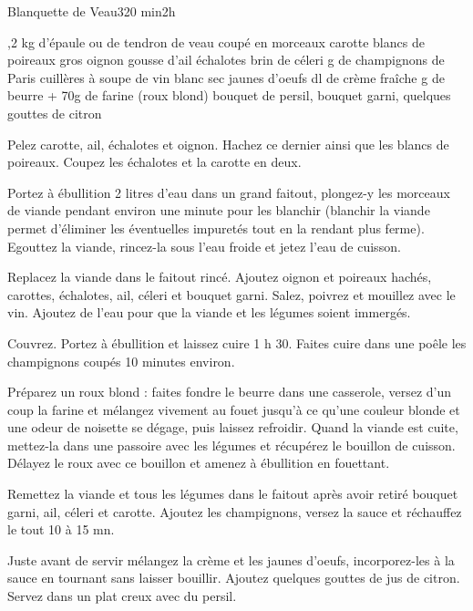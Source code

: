 \begin{recette}{Blanquette de Veau}{3}{20 min}{2h}
\begin{ingredients}
,2 kg d'épaule ou de tendron de veau coupé en morceaux
 carotte
 blancs de poireaux
 gros oignon
 gousse d'ail
 échalotes
 brin de céleri
 g de champignons de Paris
 cuillères à soupe de vin blanc sec
 jaunes d'oeufs
 dl de crème fraîche
 g de beurre + 70g de farine (roux blond)
 bouquet de persil, bouquet garni, quelques gouttes de citron
\end{ingredients}

\begin{preparation}
\etape Pelez carotte, ail, échalotes et oignon. Hachez ce dernier ainsi que les blancs de poireaux. Coupez les échalotes et la carotte en deux.

\etape Portez à ébullition 2 litres d'eau dans un grand faitout, plongez-y les morceaux de viande pendant environ une minute pour les blanchir (blanchir la viande permet d'éliminer les éventuelles impuretés tout en la rendant plus ferme). Egouttez la viande, rincez-la sous l'eau froide et jetez l'eau de cuisson.

\etape Replacez la viande dans le faitout rincé. Ajoutez oignon et poireaux hachés, carottes, échalotes, ail, céleri et bouquet garni. Salez, poivrez et mouillez avec le vin. Ajoutez de l'eau pour que la viande et les légumes soient immergés.

\etape Couvrez. Portez à ébullition et laissez cuire 1 h 30. Faites cuire dans une poêle les champignons coupés 10 minutes environ.

\etape Préparez un roux blond : faites fondre le beurre dans une casserole, versez d'un coup la farine et mélangez vivement au fouet jusqu'à ce qu'une couleur blonde et une odeur de noisette se dégage, puis laissez refroidir. Quand la viande est cuite, mettez-la dans une passoire avec les légumes et récupérez le bouillon de cuisson. Délayez le roux avec ce bouillon et amenez à ébullition en fouettant.

\etape Remettez la viande et tous les légumes dans le faitout après avoir retiré bouquet garni, ail, céleri et carotte. Ajoutez les champignons, versez la sauce et réchauffez le tout 10 à 15 mn.

\etape Juste avant de servir mélangez la crème et les jaunes d'oeufs, incorporez-les à la sauce en tournant sans laisser bouillir. Ajoutez quelques gouttes de jus de citron. Servez dans un plat creux avec du persil.
\end{preparation}



\end{recette}

